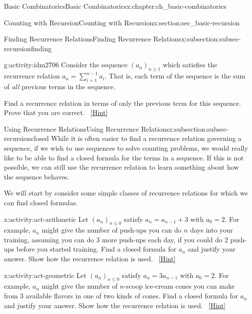 \documentclass[oneside,10pt,]{book}
\numberwithin{equation}{chapter}
\begin{document}
\begin{chapterptx}{Basic Combinatorics}{}{Basic Combinatorics}{}{}{x:chapter:ch_basic-combinatorics}
\begin{sectionptx}{Counting with Recursion}{}{Counting with Recursion}{}{}{x:section:sec_basic-recursion}
\begin{subsectionptx}{Finding Recurrence Relations}{}{Finding Recurrence Relations}{}{}{x:subsection:subsec-recursionfinding}
\begin{activity}{}{g:activity:idm2706}%
Consider the sequence \((a_n)_{n \ge 1}\) which satisfies the recurrence relation \(a_n = \sum_{i = 1}^{n-1} a_i\).  That is, each term of the sequence is the sum of \emph{all} previous terms in the sequence.%
\par
Find a recurrence relation in terms of only the previous term for this sequence.  Prove that you are correct.%
\qquad~\hfill{\tiny\hyperlink{g:hint:idm2713-back}{[Hint]}}\end{activity}
\end{subsectionptx}
%
%
\typeout{************************************************}
\typeout{************************************************}
%
\begin{subsectionptx}{Using Recurrence Relations}{}{Using Recurrence Relations}{}{}{x:subsection:subsec-recursionclosed}
While it is often easier to find a recurrence relation governing a sequence, if we wish to use sequences to solve counting problems, we would really like to be able to find a closed formula for the terms in a sequence. If this is not possible, we can still use the recurrence relation to learn something about how the sequence behaves.%
\par
We will start by consider some simple classes of recurrence relations for which we can find closed formulas.%
\begin{activity}{}{x:activity:act-arithmetic}%
Let \((a_n)_{n \le 0}\) satisfy \(a_n = a_{n-1} + 3\) with \(a_0 = 2\).  For example, \(a_n\) might give the number of push-ups you can do \(n\) days into your training, assuming you can do 3 more push-ups each day, if you could do 2 push-ups before you started training.  Find a closed formula for \(a_n\) and justify your answer.  Show how the recurrence relation is used.%
\qquad~\hfill{\tiny\hyperlink{g:hint:idm2728-back}{[Hint]}}\end{activity}
\begin{activity}{}{x:activity:act-geometric}%
Let \((a_n)_{n \le 0}\) satisfy \(a_n = 3a_{n-1}\) with \(a_0 = 2\).  For example, \(a_n\) might give the number of \(n\)-scoop ice-cream cones you can make from 3 available flavors in one of two kinds of cones.  Find a closed formula for \(a_n\) and justify your answer.  Show how the recurrence relation is used.%
\qquad~\hfill{\tiny\hyperlink{g:hint:idm2742-back}{[Hint]}}\end{activity}

\end{subsectionptx}
\end{sectionptx}
\end{chapterptx}
\end{document}
